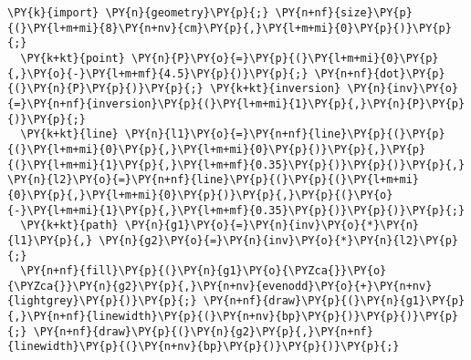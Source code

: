 \begin{Verbatim}[commandchars=\\\{\}]
  \PY{k}{import} \PY{n}{geometry}\PY{p}{;} \PY{n+nf}{size}\PY{p}{(}\PY{l+m+mi}{8}\PY{n+nv}{cm}\PY{p}{,}\PY{l+m+mi}{0}\PY{p}{)}\PY{p}{;}
  \PY{k+kt}{point} \PY{n}{P}\PY{o}{=}\PY{p}{(}\PY{l+m+mi}{0}\PY{p}{,}\PY{o}{-}\PY{l+m+mf}{4.5}\PY{p}{)}\PY{p}{;} \PY{n+nf}{dot}\PY{p}{(}\PY{n}{P}\PY{p}{)}\PY{p}{;} \PY{k+kt}{inversion} \PY{n}{inv}\PY{o}{=}\PY{n+nf}{inversion}\PY{p}{(}\PY{l+m+mi}{1}\PY{p}{,}\PY{n}{P}\PY{p}{)}\PY{p}{;}
  \PY{k+kt}{line} \PY{n}{l1}\PY{o}{=}\PY{n+nf}{line}\PY{p}{(}\PY{p}{(}\PY{l+m+mi}{0}\PY{p}{,}\PY{l+m+mi}{0}\PY{p}{)}\PY{p}{,}\PY{p}{(}\PY{l+m+mi}{1}\PY{p}{,}\PY{l+m+mf}{0.35}\PY{p}{)}\PY{p}{)}\PY{p}{,} \PY{n}{l2}\PY{o}{=}\PY{n+nf}{line}\PY{p}{(}\PY{p}{(}\PY{l+m+mi}{0}\PY{p}{,}\PY{l+m+mi}{0}\PY{p}{)}\PY{p}{,}\PY{p}{(}\PY{o}{-}\PY{l+m+mi}{1}\PY{p}{,}\PY{l+m+mf}{0.35}\PY{p}{)}\PY{p}{)}\PY{p}{;}
  \PY{k+kt}{path} \PY{n}{g1}\PY{o}{=}\PY{n}{inv}\PY{o}{*}\PY{n}{l1}\PY{p}{,} \PY{n}{g2}\PY{o}{=}\PY{n}{inv}\PY{o}{*}\PY{n}{l2}\PY{p}{;}
  \PY{n+nf}{fill}\PY{p}{(}\PY{n}{g1}\PY{o}{\PYZca{}}\PY{o}{\PYZca{}}\PY{n}{g2}\PY{p}{,}\PY{n+nv}{evenodd}\PY{o}{+}\PY{n+nv}{lightgrey}\PY{p}{)}\PY{p}{;} \PY{n+nf}{draw}\PY{p}{(}\PY{n}{g1}\PY{p}{,}\PY{n+nf}{linewidth}\PY{p}{(}\PY{n+nv}{bp}\PY{p}{)}\PY{p}{)}\PY{p}{;} \PY{n+nf}{draw}\PY{p}{(}\PY{n}{g2}\PY{p}{,}\PY{n+nf}{linewidth}\PY{p}{(}\PY{n+nv}{bp}\PY{p}{)}\PY{p}{)}\PY{p}{;}


\end{Verbatim}
